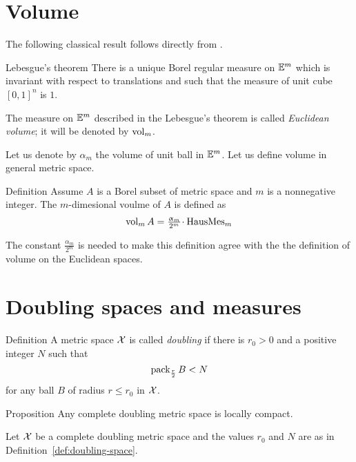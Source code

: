 \section{Volume}

The following classical result follows directly from \cite[2.7.7]{federer}.

\begin{thm}{Lebesgue's theorem}\label{thm:lebesgue}
There is a unique Borel regular  measure on $\mathbb{E}^m$
which is invariant with respect to translations
and such that the measure of unit cube $[0,1]^n$ is $1$.
\end{thm}

The measure on $\mathbb{E}^m$ described in the Lebesgue's theorem is called \emph{Euclidean volume};
it will be denoted by $\mathop{\rm vol}\nolimits_m$.

Let us denote by $\alpha_m$ the volume of unit ball in $\mathbb{E}^m$.
Let us define volume in general metric space.


\begin{thm}{Definition}\label{def:vol}
Assume $A$ is a Borel subset of metric space and $m$ is a nonnegative integer.
The $m$-dimesional voulme of $A$ is defined as 
\[\vol_mA=\tfrac{\alpha_m}{2^m}\cdot\HausMes_m\]
\end{thm}

The constant $\tfrac{\alpha_m}{2^m}$ is needed to make this definition  agree with the 
the definition of volume on the Euclidean spaces.





\section{Doubling spaces and measures}\label{sec:doubling-mes}

\begin{thm}{Definition}\label{def:doubling-space}
A metric space $\mathcal{X}$ is called 
\emph{doubling} 
if there is $r_0>0$ 
and a positive integer $N$ 
such that 
$$\mathop{\rm pack}\nolimits_{\frac r2} B<N$$
for any ball $B$ of radius $r\le r_0$ in $\mathcal{X}$.
\end{thm}

\begin{thm}{Proposition}\label{prop:2ble=>loc.compact}
Any complete doubling metric space is locally compact.
\end{thm}

 Let $\mathcal{X}$ be a complete doubling metric space 
and the values $r_0$ and $N$ are as in  Definition~\ref{def:doubling-space}.

